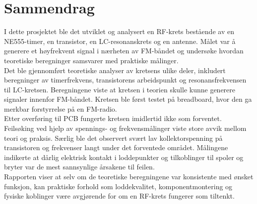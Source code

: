 \section*{Sammendrag}

I dette prosjektet ble det utviklet og analysert en RF-krets bestående av en NE555-timer, en transistor, en LC-resonanskrets og en antenne. Målet var å generere et høyfrekvent signal i nærheten av FM-båndet og undersøke hvordan teoretiske beregninger samsvarer med praktiske målinger.
\\[1em]
Det ble gjennomført teoretiske analyser av kretsens ulike deler, inkludert beregninger av timerfrekvens, transistorens arbeidspunkt og resonansfrekvensen til LC-kretsen. Beregningene viste at kretsen i teorien skulle kunne generere signaler innenfor FM-båndet. Kretsen ble først testet på breadboard, hvor den ga merkbar forstyrrelse på en FM-radio.
\\[1em]
Etter overføring til PCB fungerte kretsen imidlertid ikke som forventet. Feilsøking ved hjelp av spennings- og frekvensmålinger viste store avvik mellom teori og praksis. Særlig ble det observert svært lav kollektorspenning på transistoren og frekvenser langt under det forventede området. Målingene indikerte at dårlig elektrisk kontakt i loddepunkter og tilkoblinger til spoler og bryter var de mest sannsynlige årsakene til feilen.
\\[1em]
Rapporten viser at selv om de teoretiske beregningene var konsistente med ønsket funksjon, kan praktiske forhold som loddekvalitet, komponentmontering og fysiske koblinger være avgjørende for om en RF-krets fungerer som tiltenkt.
